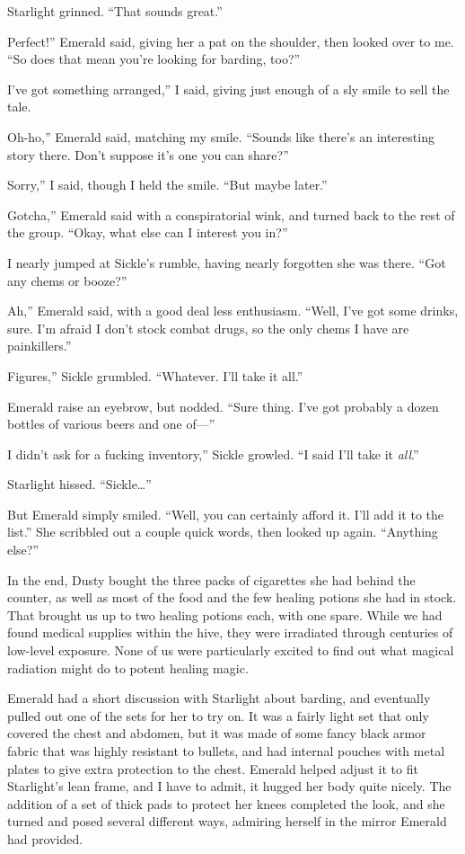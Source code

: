Starlight grinned. “That sounds great.”

\leavevmode{}Perfect!” Emerald said, giving her a pat on the shoulder, then looked over to me. “So does that mean you’re looking for barding, too?”

\leavevmode{}I’ve got something arranged,” I said, giving just enough of a sly smile to sell the tale.

\leavevmode{}Oh-ho,” Emerald said, matching my smile. “Sounds like there’s an interesting story there. Don’t suppose it’s one you can share?”

\leavevmode{}Sorry,” I said, though I held the smile. “But maybe later.”

\leavevmode{}Gotcha,” Emerald said with a conspiratorial wink, and turned back to the rest of the group. “Okay, what else can I interest you in?”

I nearly jumped at Sickle’s rumble, having nearly forgotten she was there. “Got any chems or booze?”

\leavevmode{}Ah,” Emerald said, with a good deal less enthusiasm. “Well, I’ve got some drinks, sure. I’m afraid I don’t stock combat drugs, so the only chems I have are painkillers.”

\leavevmode{}Figures,” Sickle grumbled. “Whatever. I’ll take it all.”

Emerald raise an eyebrow, but nodded. “Sure thing. I’ve got probably a dozen bottles of various beers and one of—”

\leavevmode{}I didn’t ask for a fucking inventory,” Sickle growled. “I said I’ll take it \textit{all}.”

Starlight hissed. “Sickle…”

But Emerald simply smiled. “Well, you can certainly afford it. I’ll add it to the list.” She scribbled out a couple quick words, then looked up again. “Anything else?”

In the end, Dusty bought the three packs of cigarettes she had behind the counter, as well as most of the food and the few healing potions she had in stock. That brought us up to two healing potions each, with one spare. While we had found medical supplies within the hive, they were irradiated through centuries of low-level exposure. None of us were particularly excited to find out what magical radiation might do to potent healing magic.

Emerald had a short discussion with Starlight about barding, and eventually pulled out one of the sets for her to try on. It was a fairly light set that only covered the chest and abdomen, but it was made of some fancy black armor fabric that was highly resistant to bullets, and had internal pouches with metal plates to give extra protection to the chest. Emerald helped adjust it to fit Starlight’s lean frame, and I have to admit, it hugged her body quite nicely. The addition of a set of thick pads to protect her knees completed the look, and she turned and posed several different ways, admiring herself in the mirror Emerald had provided.

